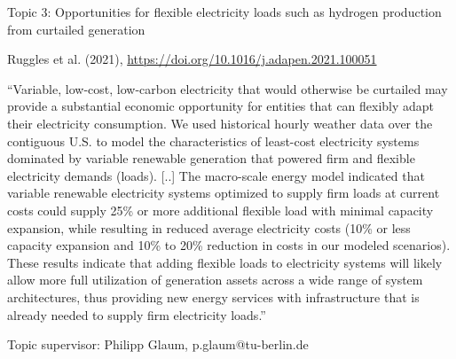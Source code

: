\documentclass[10pt,aspectratio=169,dvipsnames]{beamer}
\begin{document}
\begin{frame}
  \begin{block}{Topic 3: Opportunities for flexible electricity loads such as hydrogen production from curtailed generation}
      
    Ruggles et al. (2021), \href{https://doi.org/10.1016/j.adapen.2021.100051}{https://doi.org/10.1016/j.adapen.2021.100051}
    
    \enquote{Variable, low-cost, low-carbon electricity that would otherwise be curtailed may provide a substantial economic opportunity for entities that can flexibly adapt their electricity consumption. We used historical hourly weather data over the contiguous U.S. to model the characteristics of least-cost electricity systems dominated by variable renewable generation that powered firm and flexible electricity demands (loads). [..] The macro-scale energy model indicated that variable renewable electricity systems optimized to supply firm loads at current costs could supply 25\% or more additional flexible load with minimal capacity expansion, while resulting in reduced average electricity costs (10\% or less capacity expansion and 10\% to 20\% reduction in costs in our modeled scenarios). These results indicate that adding flexible loads to electricity systems will likely allow more full utilization of generation assets across a wide range of system architectures, thus providing new energy services with infrastructure that is already needed to supply firm electricity loads.}

    \hfill
    Topic supervisor: Philipp Glaum, p.glaum@tu-berlin.de
    
  \end{block}
\end{frame}
\end{document}
